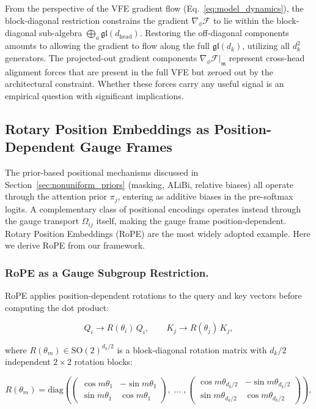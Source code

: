 \documentclass[twoside,11pt]{article}
\begin{document}
From the perspective of the VFE gradient flow (Eq.~\ref{eq:model_dynamics}), the block-diagonal restriction constrains the gradient $\nabla_\phi \mathcal{F}$ to lie within the block-diagonal sub-algebra $\bigoplus_a \mathfrak{gl}(d_{\text{head}})$. Restoring the off-diagonal components amounts to allowing the gradient to flow along the full $\mathfrak{gl}(d_k)$, utilizing all $d_k^2$ generators. The projected-out gradient components $\nabla_\phi \mathcal{F}\big|_{\mathfrak{m}}$ represent cross-head alignment forces that are present in the full VFE but zeroed out by the architectural constraint. Whether these forces carry any useful signal is an empirical question with significant implications.



\subsection{Rotary Position Embeddings as Position-Dependent Gauge Frames}
\label{sec:rope}

The prior-based positional mechanisms discussed in Section~\ref{sec:nonuniform_priors} (masking, ALiBi, relative biases) all operate through the attention prior $\pi_j$, entering as additive biases in the pre-softmax logits. A complementary class of positional encodings operates instead through the gauge transport $\Omega_{ij}$ itself, making the gauge frame position-dependent. Rotary Position Embeddings (RoPE) \citep{su2024roformer} are the most widely adopted example. Here we derive RoPE from our framework.

\subsubsection{RoPE as a Gauge Subgroup Restriction.}

RoPE applies position-dependent rotations to the query and key vectors before computing the dot product:

\begin{equation}
Q_i \to R(\theta_i)\, Q_i, \qquad K_j \to R(\theta_j)\, K_j,
\end{equation}

where $R(\theta_m) \in \mathrm{SO}(2)^{d_k/2}$ is a block-diagonal rotation matrix with $d_k/2$ independent $2\times 2$ rotation blocks:

\begin{equation}
R(\theta_m) = \mathrm{diag}\!\left(
\begin{pmatrix} \cos m\theta_1 & -\sin m\theta_1 \\ \sin m\theta_1 & \cos m\theta_1 \end{pmatrix},
\;\ldots\;,
\begin{pmatrix} \cos m\theta_{d_k/2} & -\sin m\theta_{d_k/2} \\ \sin m\theta_{d_k/2} & \cos m\theta_{d_k/2} \end{pmatrix}
\right),
\label{eq:rope_rotation}
\end{equation}
\end{document}
